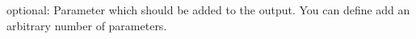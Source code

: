 optional\+: Parameter which should be added to the output. You can define add an arbitrary number of parameters. 